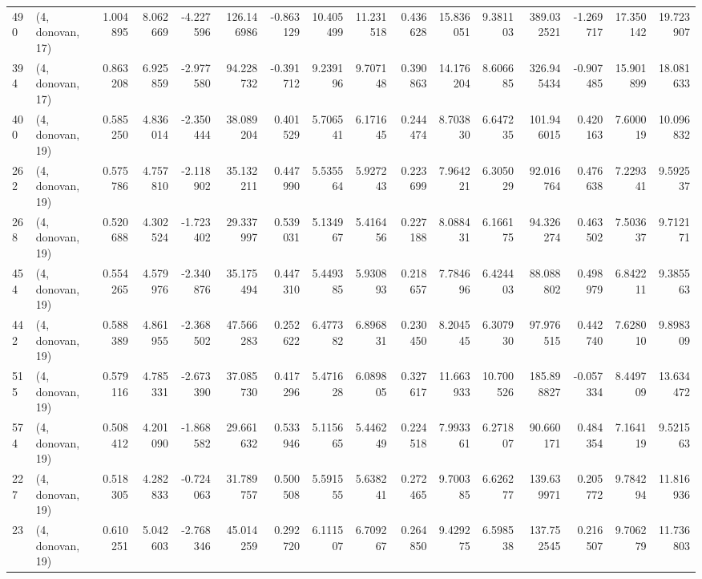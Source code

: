 \begin{tabular}{llrrrrrrrrrrrrrr}
490 &  (4, donovan, 17) &   1.004895 &   8.062669 &  -4.227596 &   126.146986 &  -0.863129 &  10.405499 &  11.231518 &  0.436628 &  15.836051 &   9.381103 &   389.032521 & -1.269717 &  17.350142 &  19.723907 \\
394 &  (4, donovan, 17) &   0.863208 &   6.925859 &  -2.977580 &    94.228732 &  -0.391712 &   9.239196 &   9.707148 &  0.390863 &  14.176204 &   8.606685 &   326.945434 & -0.907485 &  15.901899 &  18.081633 \\
400 &  (4, donovan, 19) &   0.585250 &   4.836014 &  -2.350444 &    38.089204 &   0.401529 &   5.706541 &   6.171645 &  0.244474 &   8.703830 &   6.647235 &   101.946015 &  0.420163 &   7.600019 &  10.096832 \\
262 &  (4, donovan, 19) &   0.575786 &   4.757810 &  -2.118902 &    35.132211 &   0.447990 &   5.535564 &   5.927243 &  0.223699 &   7.964221 &   6.305029 &    92.016764 &  0.476638 &   7.229341 &   9.592537 \\
268 &  (4, donovan, 19) &   0.520688 &   4.302524 &  -1.723402 &    29.337997 &   0.539031 &   5.134967 &   5.416456 &  0.227188 &   8.088431 &   6.166175 &    94.326274 &  0.463502 &   7.503637 &   9.712171 \\
454 &  (4, donovan, 19) &   0.554265 &   4.579976 &  -2.340876 &    35.175494 &   0.447310 &   5.449385 &   5.930893 &  0.218657 &   7.784696 &   6.424403 &    88.088802 &  0.498979 &   6.842211 &   9.385563 \\
442 &  (4, donovan, 19) &   0.588389 &   4.861955 &  -2.368502 &    47.566283 &   0.252622 &   6.477382 &   6.896831 &  0.230450 &   8.204545 &   6.307930 &    97.976515 &  0.442740 &   7.628010 &   9.898309 \\
515 &  (4, donovan, 19) &   0.579116 &   4.785331 &  -2.673390 &    37.085730 &   0.417296 &   5.471628 &   6.089805 &  0.327617 &  11.663933 &  10.700526 &   185.898827 & -0.057334 &   8.449709 &  13.634472 \\
574 &  (4, donovan, 19) &   0.508412 &   4.201090 &  -1.868582 &    29.661632 &   0.533946 &   5.115665 &   5.446249 &  0.224518 &   7.993361 &   6.271807 &    90.660171 &  0.484354 &   7.164119 &   9.521563 \\
227 &  (4, donovan, 19) &   0.518305 &   4.282833 &  -0.724063 &    31.789757 &   0.500508 &   5.591555 &   5.638241 &  0.272465 &   9.700385 &   6.626277 &   139.639971 &  0.205772 &   9.784294 &  11.816936 \\
23  &  (4, donovan, 19) &   0.610251 &   5.042603 &  -2.768346 &    45.014259 &   0.292720 &   6.111507 &   6.709267 &  0.264850 &   9.429275 &   6.598538 &   137.752545 &  0.216507 &   9.706279 &  11.736803 \\

\end{tabular}

